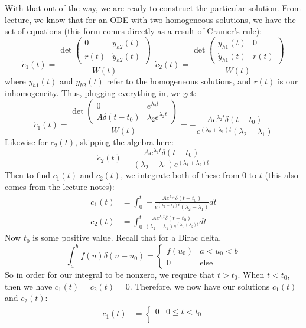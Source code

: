 \documentclass[10pt]{article}
\begin{document}
\begin{enumerate}[label=\alph*)]
\begin{solution}
\[				\] 
				With that out of the way, we are ready to construct the particular solution. From lecture, we 
				know that for an ODE with two homogeneous solutions, we have the set of equations (this 
				form comes directly as a result of Cramer's rule):
				\[
					\dot c_1(t) = \frac{\det\begin{pmatrix} 0 & y_{h 2}(t)\\ r(t) & \dot y_{h 2}(t)\end{pmatrix}}{W(t)} \ \ 
					\dot c_2(t) = \frac{\det\begin{pmatrix} y_{h 1}(t) & 0 \\ \dot y_{h 1}(t) & r(t) \end{pmatrix} }{W(t)} 
				\] 
				where $y_{h 1}(t)$ and $y_{h 2}(t)$ refer to the homogeneous solutions, and $r(t)$ is our 
				inhomogeneity. Thus, plugging everything in, we get:
				\[
					\dot c_1(t) = \frac{\det\begin{pmatrix} 0 & e^{\lambda_2 t}\\ A\delta(t - t_0) & \lambda_2e^{\lambda_2t} \end{pmatrix}}{W(t)} = -\frac{Ae^{\lambda_2 t} \delta(t - t_0)}{e^{(\lambda_2 + \lambda_1) t}(\lambda_2 - \lambda_1)}
				\] 
				Likewise for $c_2(t)$, skipping the algebra here: 
				\[
					\dot c_2(t) = \frac{Ae^{\lambda_1 t}\delta(t - t_0)}{(\lambda_2 - \lambda_1) e^{(\lambda_1 + \lambda_2) t}}
				\] 
				Then to find $c_1(t)$ and $c_2(t)$, we integrate both of these from $0$ to $t$ (this also 
				comes from the lecture notes):
				\begin{align*}
					c_1(t) &= \int_0^t -\frac{Ae^{\lambda_2 t} \delta(t - t_0)}{e^{(\lambda_2 + \lambda_1) t}(\lambda_2 - \lambda_1)} dt \\
					c_2(t) &= \int_0^t \frac{Ae^{\lambda_1 t}\delta(t - t_0)}{(\lambda_2 - \lambda_1) e^{(\lambda_1 + \lambda_2) t}} dt 
				\end{align*}
				Now $t_0$ is some positive value. Recall that for a Dirac delta, 
				\[
				\int_a^b f(u)\delta(u - u_0) = \begin{cases}
					f(u_0) & a < u_0 < b\\
					0 & \text{else}
				\end{cases}
				\] 
				So in order for our integral to be nonzero, we require that $t > t_0$. When $t < t_0$, then
				we have $c_1(t) = c_2(t) = 0$. Therefore, we now have our solutions $c_1(t)$ and $c_2(t)$:
				\begin{align*}
					c_1(t) &= \begin{cases}
						0 & 0 \le t < t_0\\

\end{cases}
\end{align*}
\end{solution}
\end{enumerate}
\end{document}
